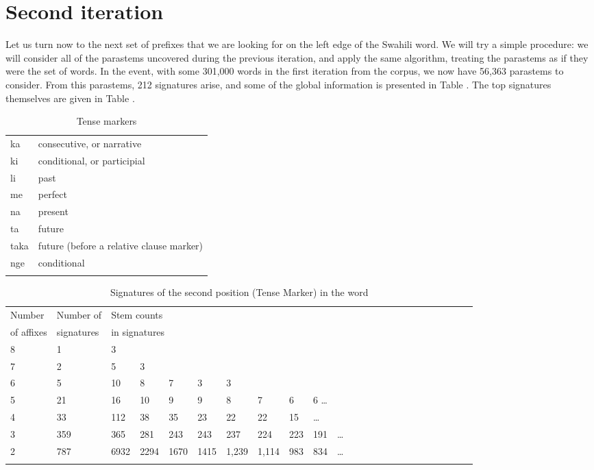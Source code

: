 \documentclass[output=paper,colorlinks,citecolor=brown,
]{langscibook}
\begin{document}
\section{Second iteration}

Let us turn now to the next set of prefixes that we are looking for on the left edge of the Swahili word. We will try a simple procedure: we will consider all of the parastems uncovered during the previous iteration, and apply the same algorithm, treating the parastems as if they were the set of words. In the event, with some 301,000 words in the first iteration from the corpus, we now have 56,363 parastems to consider. From this parastems, 212 signatures arise, and some of the global information is presented in Table . The top signatures themselves are given in Table .


\begin{table}
\begin{center}
\begin{tabular}{ll}\lsptoprule
ka &  consecutive, or narrative \\
ki&  conditional, or participial  \\
li&  past \\
me& perfect  \\
na&  present  \\
ta & future \\
taka&  future (before a relative clause marker) \\
nge & conditional \\\lspbottomrule
\end{tabular}
\caption{Tense markers}
\label{TMs}
\end{center}
\end{table} 

\begin{table}[!htbp]
\begin{tabular}{llllllllllllllllllllllll} \lsptoprule
Number  &  Number of  & \multicolumn{8}{l}{Stem counts } \\
 of affixes &   signatures & \multicolumn{8}{l}{in signatures} \\ \midrule
8 & 1 & 3  \\
7 & 2 & 5 & 3 \\
6 & 5 & 10 & 8 & 7 & 3 & 3 \\
5 & 21 & 16 & 10 &  9 &  9 &  8 & 7 & 6 &  6   \ldots \\
4 & 33 & 112 & 38 & 35 & 23 & 22 & 22 & 15 &  \ldots\\
3 & 359 & 365 & 281 & 243 & 243 & 237  & 224 & 223 & 191 &  \ldots\\
2 &  787 &6932& 2294 & 1670 & 1415 & 1,239 & 1,114 & 983 & 834  & \ldots \\ \lspbottomrule
\end{tabular}
\caption{Signatures of the second position (Tense Marker) in the word}
\label{TM-table}
\end{table}
\end{document}
